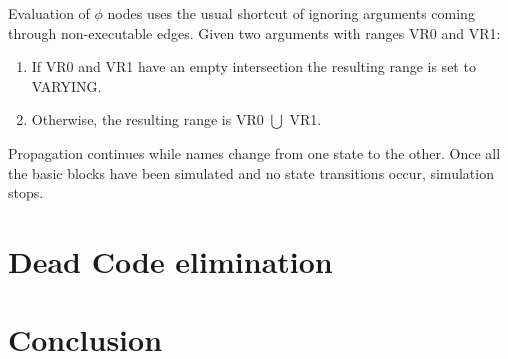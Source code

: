 Evaluation of $\phi$ nodes uses the usual shortcut of ignoring
arguments coming through non-executable edges.  Given two
arguments with ranges VR0 and VR1:

\begin{enumerate}
\item	If VR0 and VR1 have an empty intersection the resulting
	range is set to VARYING.

\item	Otherwise, the resulting range is VR0 $\bigcup$ VR1.
\end{enumerate}

Propagation continues while names change from one state to the
other.  Once all the basic blocks have been simulated and no
state transitions occur, simulation stops.

\section{Dead Code elimination}
\label{novillo:sec:dead_code_elimination}

\section{Conclusion}
\label{novillo:sec:conclusion}

